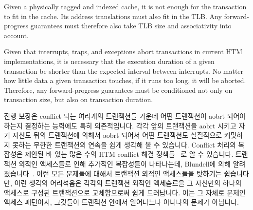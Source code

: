 Given a physically tagged and indexed cache, it is not enough for the
transaction to fit in the cache.
Its address translations must also fit in the TLB.
Any forward-progress guarantees must therefore also take TLB size
and associativity into account.

Given that interrupts, traps, and exceptions abort transactions in current
HTM implementations, it is necessary that the execution duration of
a given transaction be shorter than the expected interval between
interrupts.
No matter how little data a given transaction touches, if it runs too
long, it will be aborted.
Therefore, any forward-progress guarantees must be conditioned not only
on transaction size, but also on transaction duration.
\fi

진행 보장은 conflict 되는 여러개의 트랜잭션들 가운데 어떤 트랜잭션이 aobrt
되어야 하는지 결정하는 능력에도 특히 의존적입니다.
각각 앞의 트랜잭션을 aobrt 시키고 자기 자신도 뒤의 트랜잭션에 의해서 aobrt
되어서 어떤 트랜잭션도 실질적으로 커밋하지 못하는 무한한 트랜잭션의 연속을 쉽게
생각해 볼 수 있습니다.
Conflict 처리의 복잡성은 제안된 바 있는 많은 수의 HTM conflict 해결
정책들~\cite{EgeAkpinar2011HTM2TLE,YujieLiu2011ToxicTransactions} 로 알 수
있습니다.
트랜잭션 외적인 액세스들로 인해 추가적인 복잡성들이 나타나는데, Blundell에 의해
알려졌습니다~\cite{Blundell2006TMdeadlock}.
이런 모든 문제들에 대해서 트랜잭션 외적인 액세스들을 탓하기는 쉽습니다만, 이런
생각의 어리석음은 각각의 트랜잭션 외적인 액세슫르을 그 자신만의 하나의 액세스로
구성된 트랜잭션으로 교체함으로써 쉽게 드러납니다.
이는 그 자체로 문제인 액세스 패턴이지, 그것들이 트랜잭션 안에서 일어나느냐
아니냐의 문제가 아닙니다.
\iffalse

Forward-progress guarantees depend critically on the ability to determine
which of several conflicting transactions should be aborted.
It is all too easy to imagine an endless series of transactions, each
aborting an earlier transaction only to itself be aborted by a later
transactions, so that none of the transactions actually commit.
The complexity of conflict handling is
evidenced by the large number of HTM conflict-resolution policies
that have been proposed~\cite{EgeAkpinar2011HTM2TLE,YujieLiu2011ToxicTransactions}.
Additional complications are introduced by extra-transactional accesses,
as noted by Blundell~\cite{Blundell2006TMdeadlock}.
It is easy to blame the extra-transactional accesses for all of these
problems, but the folly of this line of thinking is easily demonstrated
by placing each of the extra-transactional accesses into its own
single-access transaction.
It is the pattern of accesses that is the issue, not whether or not they
happen to be enclosed in a transaction.
\fi

